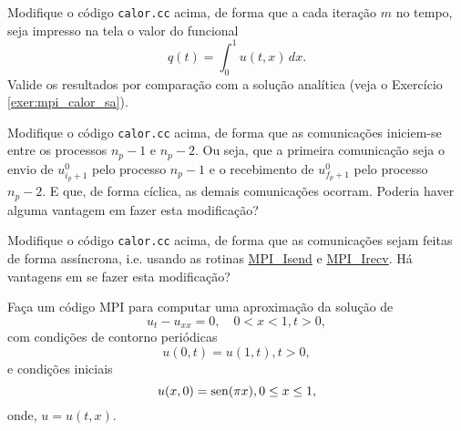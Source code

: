 \begin{exer}
  Modifique o código \verb+calor.cc+ acima, de forma que a cada iteração $m$ no tempo, seja impresso na tela o valor do funcional
  \begin{equation}
    q(t) = \int_0^1 u(t,x)\,dx.
  \end{equation}
  Valide os resultados por comparação com a solução analítica (veja o Exercício \eqref{exer:mpi_calor_sa}).
\end{exer}

\begin{exer}
  Modifique o código \verb+calor.cc+ acima, de forma que as comunicações iniciem-se entre os processos $n_p-1$ e $n_p-2$. Ou seja, que a primeira comunicação seja o envio de $u^0_{i_p+1}$ pelo processo $n_p-1$ e o recebimento de $u^0_{f_p+1}$ pelo processo $n_p-2$. E que, de forma cíclica, as demais comunicações ocorram. Poderia haver alguma vantagem em fazer esta modificação?
\end{exer}

\begin{exer}
  Modifique o código \verb+calor.cc+ acima, de forma que as comunicações sejam feitas de forma assíncrona, i.e. usando as rotinas \href{https://www.open-mpi.org/doc/v1.8/man3/MPI\_Isend.3.php}{MPI\_Isend} e \href{https://www.open-mpi.org/doc/v1.8/man3/MPI\_Irecv.3.php}{MPI\_Irecv}. Há vantagens em se fazer esta modificação?
\end{exer}

\begin{exer}
  Faça um código MPI para computar uma aproximação da solução de
  \begin{equation}
    u_t - u_{xx} = 0,\quad 0<x<1, t>0,
  \end{equation}
  com condições de contorno periódicas
  \begin{equation}
    u(0,t) = u(1,t), t>0,
  \end{equation}
  e condições iniciais
  \begin{equation}
    u(x,0) = \operatorname{sen}(\pi x), 0\leq x\leq 1,
  \end{equation}
  onde, $u = u(t, x)$.  
\end{exer}



